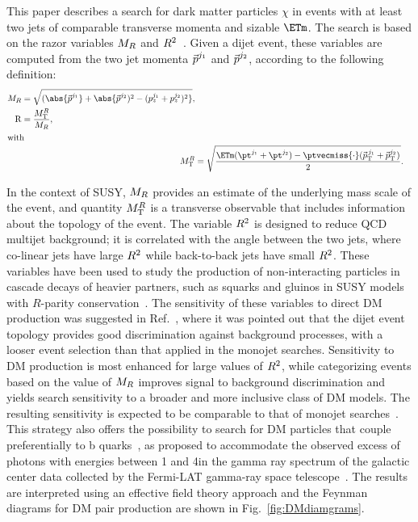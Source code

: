 This paper describes a search for dark matter particles $\chi$ in events with at least two jets of comparable transverse momenta
and sizable $\ETm$. The search is based
on the razor variables $M_R$ and $R^2$~\cite{rogan,razor2010}.  Given a
dijet event, these variables are computed from the two jet momenta $\vec{p\mkern0mu}^{j_1}$ and
$\vec{p\mkern0mu}^{j_2}$, according to the following
definition:
 \begin{align}
 \begin{split}
 \MR  & =
 \sqrt{
  (\abs{\vv{p}^{j_1}}+\abs{\vv{p}^{j_{2}})^2 -
  (p^{j_1}_{z}+p^{j_2}_{z})^2}},
\\
 \mathrm{R}  & =   \frac{M^{\RR}_\mathrm{T}}{\MR},
\label{eq:razor}
\end{split}\\
\intertext{with}
 \label{eq:MTR}
 M^{\RR}_\mathrm{T}  &=   \sqrt{ \frac{\ETm(\pt^{j_1}+\pt^{j_2}) -
   \ptvecmiss {\cdot}
   (\vv{p}_{\mathrm{T}}^{\,j_1}+\vv{p}_{\mathrm{T}}^{j_2})}{2}}.
\end{align}

In the context of SUSY, $M_R$ provides an estimate of the
underlying mass scale of the event, and quantity $M^{R}_\mathrm{T}$ is a transverse
observable that includes information about the
topology of the event. The variable $R^2$ is designed to reduce QCD
multijet background; it is correlated with the angle
between the two jets, where co-linear jets have large $R^2$ while back-to-back jets have small $R^2$.
These variables have been used to study the production of non-interacting
particles in cascade decays of heavier partners, such as squarks and
gluinos in SUSY models with $R$-parity
conservation~\cite{Chatrchyan:2014goa,Razor8TeV}. The sensitivity of
these variables to direct DM production was suggested in
Ref.~\cite{Fox:2012ee}, where it was pointed out that the dijet event
topology provides good discrimination against background processes,
with a looser event selection than that applied in the monojet searches.
Sensitivity to DM production is most enhanced for large values of
$R^2$, while categorizing events based on the value of $M_R$
improves signal to background discrimination and yields search
sensitivity to a broader and more inclusive class of DM models. The resulting sensitivity is expected to be 
comparable to that of monojet searches~\cite{Fox:2012ee,Papucci:2014iwa}. This
strategy also offers the possibility to search for DM particles that
couple preferentially to b quarks~\cite{Agrawal:2014una}, as proposed
to accommodate the observed excess of photons with energies between
1 and 4\GeV in the gamma ray spectrum of the galactic center data collected by the Fermi-LAT gamma-ray space
telescope~\cite{Hooper:2010mq}. The results are interpreted using an
effective field theory approach and the Feynman diagrams for DM pair production are shown in Fig.~\ref{fig:DMdiamgrams}.

